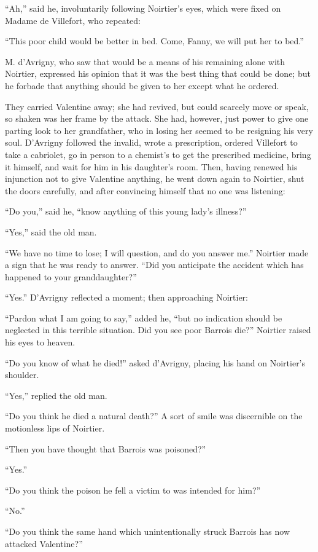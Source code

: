 “Ah,” said he, involuntarily following Noirtier’s eyes, which were
fixed on Madame de Villefort, who repeated:

“This poor child would be better in bed. Come, Fanny, we will put her
to bed.”

M. d’Avrigny, who saw that would be a means of his remaining alone with
Noirtier, expressed his opinion that it was the best thing that could
be done; but he forbade that anything should be given to her except
what he ordered.

They carried Valentine away; she had revived, but could scarcely move
or speak, so shaken was her frame by the attack. She had, however, just
power to give one parting look to her grandfather, who in losing her
seemed to be resigning his very soul. D’Avrigny followed the invalid,
wrote a prescription, ordered Villefort to take a cabriolet, go in
person to a chemist’s to get the prescribed medicine, bring it himself,
and wait for him in his daughter’s room. Then, having renewed his
injunction not to give Valentine anything, he went down again to
Noirtier, shut the doors carefully, and after convincing himself that
no one was listening:

“Do you,” said he, “know anything of this young lady’s illness?”

“Yes,” said the old man.

“We have no time to lose; I will question, and do you answer me.”
Noirtier made a sign that he was ready to answer. “Did you anticipate
the accident which has happened to your granddaughter?”

“Yes.” D’Avrigny reflected a moment; then approaching Noirtier:

“Pardon what I am going to say,” added he, “but no indication should be
neglected in this terrible situation. Did you see poor Barrois die?”
Noirtier raised his eyes to heaven.

“Do you know of what he died!” asked d’Avrigny, placing his hand on
Noirtier’s shoulder.

“Yes,” replied the old man.

“Do you think he died a natural death?” A sort of smile was discernible
on the motionless lips of Noirtier.

“Then you have thought that Barrois was poisoned?”

“Yes.”

“Do you think the poison he fell a victim to was intended for him?”

“No.”

“Do you think the same hand which unintentionally struck Barrois has
now attacked Valentine?”

